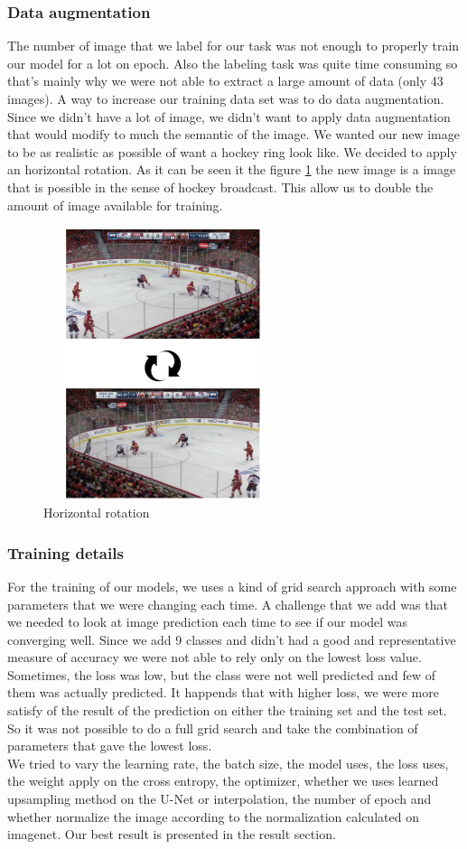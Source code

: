 \subsubsection{Data augmentation}
The number of image that we label for our task was not enough to properly train our model for a lot on epoch. Also the labeling task was quite time consuming so that's mainly why we were not able to extract a large amount of data (only 43 images). A way to increase our training data set was to do data augmentation. Since we didn't have a lot of image, we didn't want to apply data augmentation that would modify to much the semantic of the image. We wanted our new image to be as realistic as possible of want a hockey ring look like. We decided to apply an horizontal rotation. As it can be seen it the figure \ref{fig:flip} the new image is a image that is possible in the sense of hockey broadcast. This allow us to double the amount of image available for training. 
\begin{figure}[H]
	\centering
	\includegraphics[width=7cm,height=8cm]{figures/rotation-example.png}
	\caption{Horizontal rotation}
	\label{fig:flip}
\end{figure}

\subsubsection{Training details}
For the training of our models, we uses a kind of grid search approach with some parameters that we were changing each time. A challenge that we add was that we needed to look at image prediction each time to see if our model was converging well. Since we add 9 classes and didn't had a good and representative measure of accuracy we were not able to rely only on the lowest loss value. Sometimes, the loss was low, but the class were not well predicted and few of them was actually predicted. It happends that with higher loss, we were more satisfy of the result of the prediction on either the training set and the test set. So it was not possible to do a full grid search and take the combination of parameters that gave the lowest loss. 
\\
We tried to vary the learning rate, the batch size, the model uses, the loss uses, the weight apply on the cross entropy, the optimizer, whether we uses learned upsampling method on the U-Net or interpolation, the number of epoch and whether normalize the image according to the normalization calculated on imagenet. Our best result is presented in the result section. 

